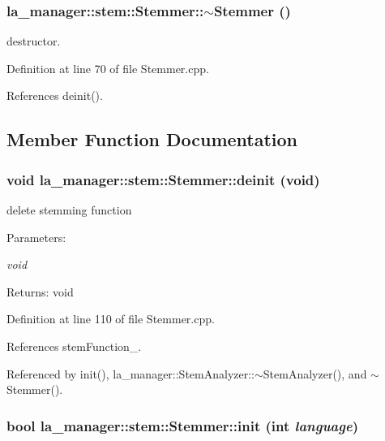 \begin{CompactItemize}
{\subsubsection[{$\sim$Stemmer}]{\setlength{\rightskip}{0pt plus 5cm}la\_\-manager::stem::Stemmer::$\sim$Stemmer ()}}
\label{classla__manager_1_1stem_1_1Stemmer_e54d92f62c8e22bd9576d37358f9b40b}


destructor. 

Definition at line 70 of file Stemmer.cpp.

References deinit().

\subsection{Member Function Documentation}
\hypertarget{classla__manager_1_1stem_1_1Stemmer_2c61f6050413b747587df7cdf7a00105}{
\subsubsection[{deinit}]{\setlength{\rightskip}{0pt plus 5cm}void la\_\-manager::stem::Stemmer::deinit (void)}}
\label{classla__manager_1_1stem_1_1Stemmer_2c61f6050413b747587df7cdf7a00105}


delete stemming function \begin{Desc}
\item[Parameters:]
\begin{description}
\item[{\em void}]\end{description}
\end{Desc}
\begin{Desc}
\item[Returns:]void \end{Desc}


Definition at line 110 of file Stemmer.cpp.

References stemFunction\_\-.

Referenced by init(), la\_\-manager::StemAnalyzer::$\sim$StemAnalyzer(), and $\sim$Stemmer().\hypertarget{classla__manager_1_1stem_1_1Stemmer_63dc57b0526d83e3de922f71441e0ba7}{
\subsubsection[{init}]{\setlength{\rightskip}{0pt plus 5cm}bool la\_\-manager::stem::Stemmer::init (int {\em language})}}
\label{classla__manager_1_1stem_1_1Stemmer_63dc57b0526d83e3de922f71441e0ba7}



\end{CompactItemize}

